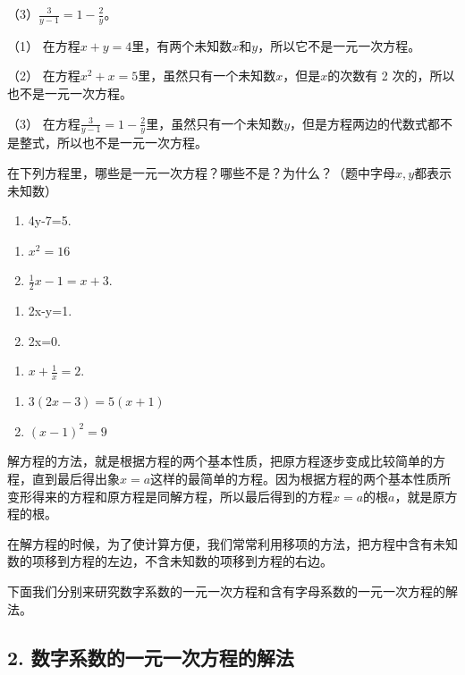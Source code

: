 （3）\(\frac{3}{y - 1} = 1 - \frac{2}{y}\)。

 （1）
在方程\(x + y = 4\)里，有两个未知数\(x\)和\(y\)，所以它不是一元一次方程。

（2）
在方程\(x^{2} + x = 5\)里，虽然只有一个未知数\(x\)，但是\(x\)的次数有 2
次的，所以也不是一元一次方程。

（3）
在方程\(\frac{3}{y - 1} = 1 - \frac{2}{y}\)里，虽然只有一个未知数\(y\)，但是方程两边的代数式都不是整式，所以也不是一元一次方程。

在下列方程里，哪些是一元一次方程？哪些不是？为什么？（题中字母\(x, y\)都表示未知数）

\begin{enumerate}
\item
  4y-7=5.
\end{enumerate}

\begin{enumerate}[start=2]
\item
  \(x^{2} = 16\)
\item
  \(\frac{1}{2} x - 1 = x + 3.\)
\end{enumerate}

\begin{enumerate}[start=4]
\item
  2x-y=1.
\item
  2x=0.
\end{enumerate}

\begin{enumerate}[start=6]
\item
  \(x + \frac{1}{x} = 2.\)
\end{enumerate}

\begin{enumerate}[start=7]
\item
  \(3(2x-3)=5(x+1)\)
\item
  \((x - 1)^{2} = 9\)
\end{enumerate}

解方程的方法，就是根据方程的两个基本性质，把原方程逐步变成比较简单的方程，直到最后得出象\(x = a\)这样的最简单的方程。因为根据方程的两个基本性质所变形得来的方程和原方程是同解方程，所以最后得到的方程\(x = a\)的根\(a\)，就是原方程的根。

在解方程的时候，为了使计算方便，我们常常利用移项的方法，把方程中含有未知数的项移到方程的左边，不含未知数的项移到方程的右边。

下面我们分别来研究数字系数的一元一次方程和含有字母系数的一元一次方程的解法。

\subsection{2. 数字系数的一元一次方程的解法}

